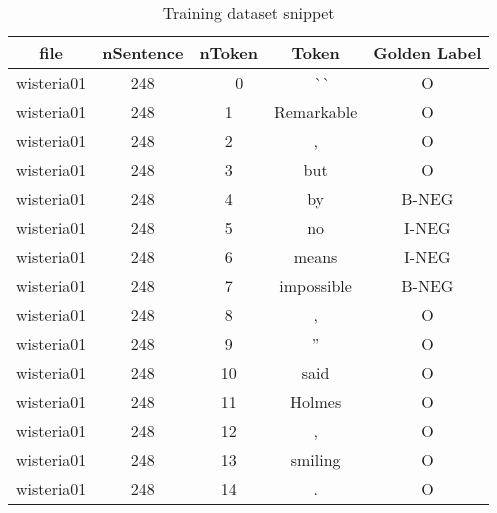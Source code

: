\begin{table}[!h]
\centering
\caption{\label{tab:trainingdf}Training dataset snippet}
\begin{tabular}{ccccc}
\hline
file       & nSentence & nToken & Token        & Golden Label  \\ 
\hline
wisteria01 & 248       & ~ ~0   & ~ ~\`{}\`{}~ & O             \\
wisteria01 & 248       & 1      & Remarkable   & O             \\
wisteria01 & 248       & 2      & ,            & O             \\
wisteria01 & 248       & 3      & but          & O             \\
wisteria01 & 248       & 4      & by           & B-NEG         \\
wisteria01 & 248       & 5      & no           & I-NEG         \\
wisteria01 & 248       & 6      & means        & I-NEG         \\
wisteria01 & 248       & 7      & impossible   & B-NEG         \\
wisteria01 & 248       & 8      & ,            & O             \\
wisteria01 & 248       & 9      & ''           & O             \\
wisteria01 & 248       & 10     & said         & O             \\
wisteria01 & 248       & 11     & Holmes       & O             \\
wisteria01 & 248       & 12     & ,            & O             \\
wisteria01 & 248       & 13     & smiling      & O             \\
wisteria01 & 248       & 14     & .            & O             \\
\hline
\end{tabular}
\end{table}

